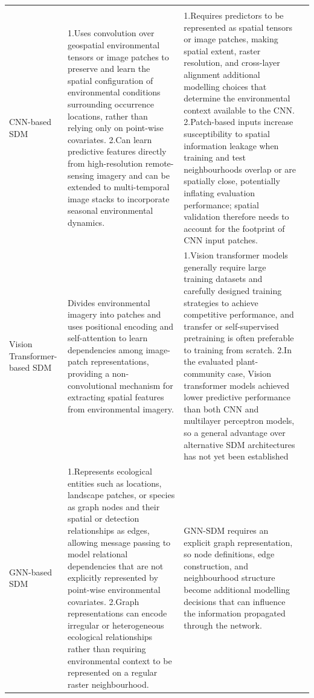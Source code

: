 \documentclass[authoryear,preprint,review,12pt]{elsarticle}
\begin{document}
\begin{landscape}
\begin{xltabular}{\linewidth}{
@{}
>{\raggedright\arraybackslash}p{3cm}
>{\raggedright\arraybackslash}p{9cm}
>{\raggedright\arraybackslash}p{9cm}
>{\raggedright\arraybackslash}p{4cm}
@{}
}
\\
\addlinespace[3pt]
CNN-based SDM &
1.Uses convolution over geospatial environmental tensors or image patches to preserve and learn the spatial configuration of environmental conditions surrounding occurrence locations, rather than relying only on point-wise covariates.
2.Can learn predictive features directly from high-resolution remote-sensing imagery and can be extended to multi-temporal image stacks to incorporate seasonal environmental dynamics. &
1.Requires predictors to be represented as spatial tensors or image patches, making spatial extent, raster resolution, and cross-layer alignment additional modelling choices that determine the environmental context available to the CNN.
2.Patch-based inputs increase susceptibility to spatial information leakage when training and test neighbourhoods overlap or are spatially close, potentially inflating evaluation performance; spatial validation therefore needs to account for the footprint of CNN input patches. &
\citep{deneu2021convolutional,estopinan2022deep,kellenberger2026performance,deneu2022very,gillespie2024deep} \\

Vision Transformer-based SDM &
Divides environmental imagery into patches and uses positional encoding and self-attention to learn dependencies among image-patch representations, providing a non-convolutional mechanism for extracting spatial features from environmental imagery. &
1.Vision transformer models generally require large training datasets and carefully designed training strategies to achieve competitive performance, and transfer or self-supervised pretraining is often preferable to training from scratch.
2.In the evaluated plant-community case, Vision transformer models achieved lower predictive performance than both CNN and multilayer perceptron models, so a general advantage over alternative SDM architectures has not yet been established&
\citep{hu2025introduction,chen2024mitree,zhang2022multimodal} \\

GNN-based SDM &
1.Represents ecological entities such as locations, landscape patches, or species as graph nodes and their spatial or detection relationships as edges, allowing message passing to model relational dependencies that are not explicitly represented by point-wise environmental covariates.
2.Graph representations can encode irregular or heterogeneous ecological relationships rather than requiring environmental context to be represented on a regular raster neighbourhood. &
GNN-SDM requires an explicit graph representation, so node definitions, edge construction, and neighbourhood structure become additional modelling decisions that can influence the information propagated through the network. &
\citep{wu2025gnn,corso2024graph} \\


\end{xltabular}
\end{landscape}
\end{document}
